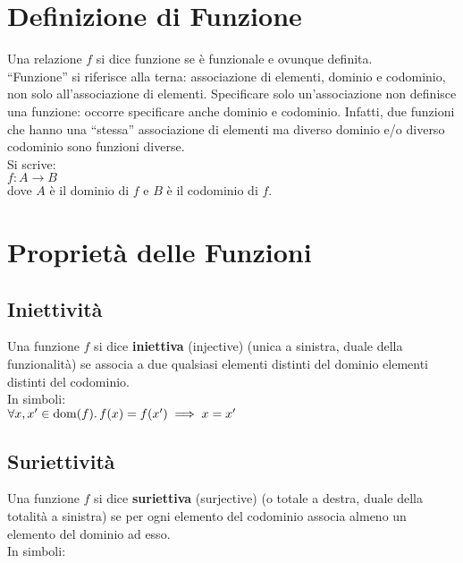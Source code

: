 \documentclass[a4paper, twoside, italian, 11pt]{book}
\DeclareMathOperator{\dom}{dom}
\begin{document}
\section{Definizione di Funzione}

Una relazione $f$ si dice funzione se è funzionale e ovunque definita. \\

\noindent
``Funzione'' si riferisce alla terna: associazione di elementi, dominio e codominio, non solo all'associazione di elementi. Specificare solo un'associazione non definisce una funzione: occorre specificare anche dominio e codominio. Infatti, due funzioni che hanno una ``stessa'' associazione di elementi ma diverso dominio e/o diverso codominio sono funzioni diverse. \\

\noindent
Si scrive: \\
$f : A \rightarrow B$ \\
dove $A$ è il dominio di $f$ e $B$ è il codominio di $f$.


\section{Proprietà delle Funzioni}


\subsection{Iniettività}

Una funzione $f$ si dice \textbf{iniettiva} (injective) (unica a sinistra, duale della funzionalità) se associa a due qualsiasi elementi distinti del dominio elementi distinti del codominio. \\

\noindent
In simboli: \\

$\forall x, x' \in \dom(f) \ldotp f(x) = f(x') \implies x = x'$


\subsection{Suriettività}

Una funzione $f$ si dice \textbf{suriettiva} (surjective) (o totale a destra, duale della totalità a sinistra) se per ogni elemento del codominio associa almeno un elemento del dominio ad esso. \\

\noindent
In simboli: \\
\end{document}
